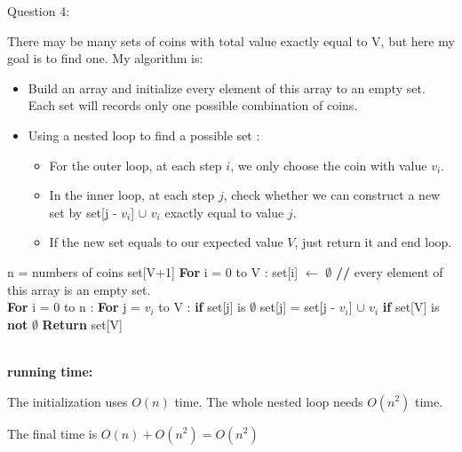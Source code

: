 \documentclass[12pt]{article}
\begin{document}
\pagebreak
\noindent
\large Question 4: \par
\normalsize 
There may be many sets of coins with total value exactly equal to V, but here my goal is to find one. 
My algorithm is:
\begin{itemize}
  \item	Build an array and initialize every element of this array to an empty set. 
	Each set will records only one possible combination of coins. 
  \item	Using a nested loop to find a possible set :
	\begin{itemize}
	  \item For the outer loop, at each step $i$, we only choose the coin with value $v_i$.
	  \item In the inner loop, at each step $j$, check whether we can construct a new set by set[j - $v_i$] $\cup$ $v_i$ exactly equal to value $j$.
	  \item If the new set equals to our expected value $V$, just return it and end loop. 
	\end{itemize}
\end{itemize}

\begin{algorithm}
\begin{algorithmic}
\State n = numbers of coins
\State set[V+1]
\State \textbf{For} i = 0 to V :
\State \hspace{0.4cm} set[i] $\leftarrow$ $\emptyset$ \textbf{ //} every element of this array is an empty set.  \\

\State \textbf{For} i = 0 to n :
\State \hspace{0.4cm} \textbf{For} j = $v_i$ to V :
\State \hspace{0.8cm} \textbf{if} set[j] is $\emptyset$
\State \hspace{1.2cm} set[j] = set[j - $v_i$] $\cup$ $v_i$
\State \hspace{0.8cm} \textbf{if} set[V] is \textbf{not} $\emptyset$
\State \hspace{1.2cm} \textbf{Return} set[V]
\end{algorithmic}
\end{algorithm}
\noindent \\
\textbf{running time:} \par
The initialization uses $O(n)$ time. 
The whole nested loop needs $O(n^2)$ time. \par
The final time is $O(n) + O(n^2) = O(n^2)$
\end{document}
